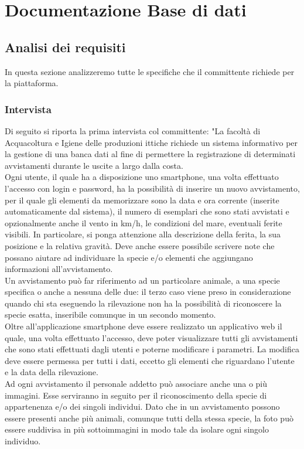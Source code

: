 \documentclass[a4paper,final,12pt]{report}
\begin{document}
\chapter{Documentazione Base di dati}
\section{Analisi dei requisiti}
In questa sezione analizzeremo tutte le specifiche che il committente richiede per la piattaforma.

\subsection{Intervista}
Di seguito si riporta la prima intervista col committente:
"La facoltà di Acquacoltura e Igiene delle produzioni ittiche richiede un sistema informativo per la gestione di una banca dati al fine di permettere la registrazione di determinati avvistamenti durante le uscite a largo dalla costa.\\
Ogni utente, il quale ha a disposizione uno smartphone, una volta effettuato l'accesso con login e password, ha la possibilità di inserire un nuovo avvistamento, per il quale gli elementi da memorizzare sono la data e ora corrente (inserite automaticamente dal sistema), il numero di esemplari che sono stati avvistati e opzionalmente anche il vento in km/h, le condizioni del mare, eventuali ferite visibili. In particolare, si ponga attenzione alla descrizione della ferita, la sua posizione e la relativa gravità. Deve anche essere possibile scrivere note che possano aiutare ad individuare la specie e/o elementi che aggiungano informazioni all'avvistamento. 
\\
Un avvistamento può far riferimento ad un particolare animale, a una specie specifica o anche a nessuna delle due: il terzo caso viene preso in considerazione quando chi sta eseguendo la rilevazione non ha la possibilità di riconoscere la specie esatta, inseribile comunque in un secondo momento.
\\
Oltre all'applicazione smartphone deve essere realizzato un applicativo web il quale, una volta effettuato l'accesso, deve poter visualizzare tutti gli avvistamenti che sono stati effettuati dagli utenti e poterne modificare i parametri. La modifica deve essere permessa per tutti i dati, eccetto gli elementi che riguardano l'utente e la data della rilevazione.
\\ 
Ad ogni avvistamento il personale addetto può associare anche una o più immagini. Esse serviranno in seguito per il riconoscimento della specie di appartenenza e/o dei singoli individui. Dato che in un avvistamento possono essere presenti anche più animali, comunque tutti della stessa specie, la foto può essere suddivisa in più sottoimmagini in modo tale da isolare ogni singolo individuo.
\end{document}

